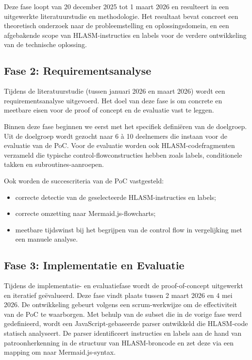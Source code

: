 Deze fase loopt van 20 december 2025 tot 1 maart 2026 en resulteert in een uitgewerkte literatuurstudie en methodologie. Het resultaat bevat concreet een theoretisch onderzoek naar de probleemstelling en oplossingsdomein, en een afgebakende scope van HLASM-instructies en labels voor de verdere ontwikkeling van de technische oplossing.

\subsection{Fase 2: Requirementsanalyse}

Tijdens de literatuurstudie (tussen januari 2026 en maart 2026) wordt een requirementsanalyse uitgevoerd. Het doel van deze fase is om concrete en meetbare eisen voor de proof of concept en de evaluatie vast te leggen. 

Binnen deze fase beginnen we eerst met het specifiek definiëren van de doelgroep. Uit de doelgroep wordt gezocht naar 6 à 10 deelnemers die instaan voor de evaluatie van de PoC. Voor de evaluatie worden ook HLASM-codefragmenten verzameld die typische control-flowconstructies hebben zoals labels, conditionele takken en subroutines-aanroepen. 

Ook worden de succescriteria van de PoC vastgesteld: 
\begin{itemize}  
    \item correcte detectie van de geselecteerde HLASM-instructies en labels;
    \item correcte omzetting naar Mermaid.js-flowcharts;
    \item meetbare tijdswinst bij het begrijpen van de control flow in vergelijking met een manuele analyse.  
\end{itemize}

\subsection{Fase 3: Implementatie en Evaluatie}

Tijdens de implementatie- en evaluatiefase wordt de proof-of-concept uitgewerkt en iteratief geëvalueerd. Deze fase vindt plaats tussen 2 maart 2026 en 4 mei 2026. De ontwikkeling gebeurt volgens een scrum-werkwijze om de effectiviteit van de PoC te waarborgen. Met behulp van de subset die in de vorige fase werd gedefinieerd, wordt een JavaScript-gebaseerde parser ontwikkeld die HLASM-code statisch analyseert. De parser identificeert instructies en labels aan de hand van patroonherkenning in de structuur van HLASM-broncode en zet deze via een mapping om naar Mermaid.js-syntax.


